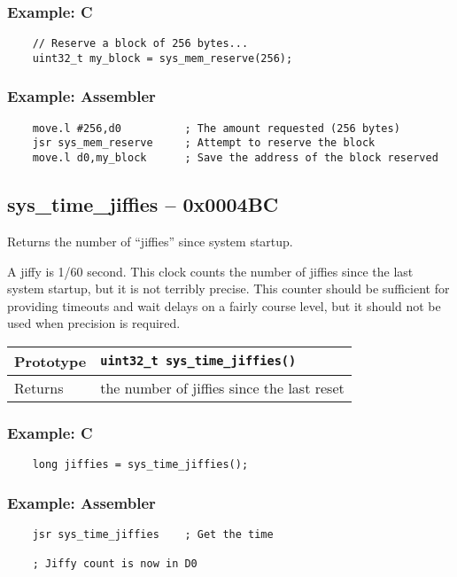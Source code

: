 \subsubsection*{Example: C}
\begin{lstlisting}
    // Reserve a block of 256 bytes...
    uint32_t my_block = sys_mem_reserve(256);    
\end{lstlisting}

\subsubsection*{Example: Assembler}
\begin{verbatim}
    move.l #256,d0          ; The amount requested (256 bytes)
    jsr sys_mem_reserve     ; Attempt to reserve the block
    move.l d0,my_block      ; Save the address of the block reserved
\end{verbatim}

\subsection*{sys\_time\_jiffies -- 0x0004BC}
Returns the number of ``jiffies'' since system startup.

A jiffy is 1/60 second. This clock counts the number of jiffies since the last system startup, but it is not terribly precise.
This counter should be sufficient for providing timeouts and wait delays on a fairly course level, but it should not be used when precision is required.

\bigskip

\begin{tabular}{|l||l|} \hline
Prototype & \lstinline!uint32_t sys_time_jiffies()! \\ \hline
Returns & the number of jiffies since the last reset \\ \hline
\end{tabular}

\subsubsection*{Example: C}
\begin{lstlisting}
    long jiffies = sys_time_jiffies();
\end{lstlisting}

\subsubsection*{Example: Assembler}
\begin{verbatim}
    jsr sys_time_jiffies    ; Get the time

    ; Jiffy count is now in D0
\end{verbatim}

